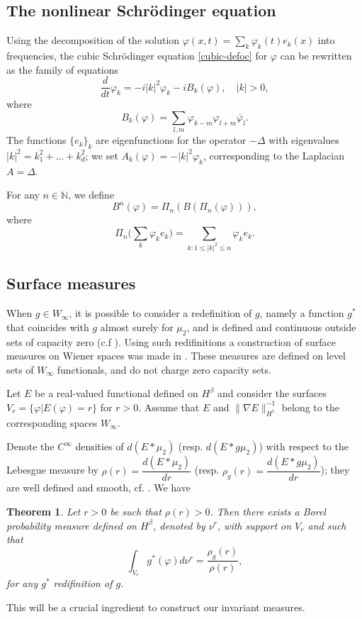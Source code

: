 \documentclass[11pt,leqno]{amsart}
\newtheorem{thm}{Theorem}[section]
\newcommand{\N}{\mathbb{N}}
\begin{document}
\subsection{The nonlinear Schr\"odinger equation}
  Using the decomposition of the solution $\varphi(x,t)=\sum_k \varphi_k(t) e_k(x)$  into frequencies, the cubic Schr\" odinger equation \eqref{cubic-defoc}  for $\varphi$ 
 can be rewritten as the family of equations 
$$\dfrac{d}{dt}\varphi_k = -i |k|^2 \varphi_k -i B_k (\varphi), \quad |k|>0, $$
 where 
$$B_k (\varphi)=  \sum_{l,m} \varphi_{k-m} \varphi_{l+m} \overline{\varphi}_l .$$
The functions $\{e_k\}_k$ are eigenfunctions for the operator $-\Delta$ with eigenvalues $|k|^2 =k_1^2+\ldots  +k_d^2$; 
 we set $A_k (\varphi )=-|k|^2 \varphi_k$, corresponding to the Laplacian $A=\Delta$.






For any $n\in \N$, we define 
$$B^n (\varphi)= \Pi_n (B(\Pi_n (\varphi))),$$
where 
$$\Pi_n \Big(\sum_{k} \varphi_k e_k\Big) = \sum_{k: 1\leq |k|^2 \leq n} \varphi_k e_k. $$


\subsection{Surface measures}
When $g\in W_\infty$, it is possible to  consider a redefinition of  $g$,  namely a function $g^\ast$ that coincides with $g$ almost surely   for $\mu_2$, 
 and is defined and continuous 
outside sets of capacity zero (c.f \cite{M}). Using such redifinitions a construction of surface measures on Wiener spaces was made in \cite{AM}. 
These measures are defined on level sets of $W_\infty$ functionals,  and do not charge zero  capacity sets. 

Let $E$ be a real-valued functional defined on $H^{\beta}$ and consider the surfaces $V_r =\{\varphi | E(\varphi)=r\}$ for $r>0$.
Assume that $E$ and $\| \nabla E \|^{-1}_{H^1}$ belong to the corresponding spaces $W_\infty$. 






Denote the $C^\infty$ densities of $d(E \ast \mu_2)$ (resp. $d(E \ast g \mu_2)$) with respect to the Lebesgue measure by $\rho (r)= \dfrac{d (E\ast \mu_2)}{dr}$ 
(resp. $\rho_g (r)= \dfrac{d (E\ast g\mu_2)}{dr}$); they  are well defined and smooth, cf. \cite{AM}.
We have 
\begin{thm} \cite{AM}
\label{thmredi}
Let $r>0$ be such that $\rho (r)>0$. Then there exists a Borel probability measure defined on $H^\beta$, denoted by $\nu^r$, with support on $V_r$ and such that
$$\int_{V_r} g^\ast (\varphi) d\nu^r = \dfrac{\rho_g (r)}{\rho (r)},$$
for any $g^\ast$ redifinition of $g$.
\end{thm}
This will be a crucial ingredient to construct our invariant measures. 
\end{document}
